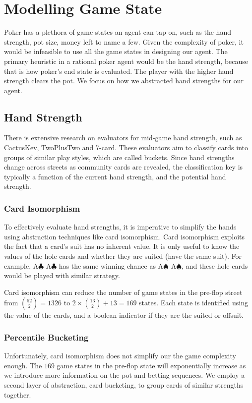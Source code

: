 \documentclass{article}
\begin{document}
\section{Modelling Game State}
Poker has a plethora of game states an agent can tap on, such as the hand strength, pot size, money left to name a few. Given the complexity of poker, it would be infeasible to use all the game states in designing our agent. The primary heuristic in a rational poker agent would be the hand strength, because that is how poker's end state is evaluated. The player with the higher hand strength clears the pot. We focus on how we abstracted hand strengths for our agent.

\subsection{Hand Strength}
There is extensive research on evaluators for mid-game hand strength, such as CactusKev, TwoPlusTwo and 7-card. These evaluators aim to classify cards into groups of similar play styles, which are called buckets. Since hand strengths change across streets as community cards are revealed, the classification key is typically a function of the current hand strength, and the potential hand strength.

\subsubsection{Card Isomorphism}
To effectively evaluate hand strengths, it is imperative to simplify the hands using abstraction techniques like card isomorphism. Card isomorphism exploits the fact that a card's suit has no inherent value. It is only useful to know the values of the hole cards and whether they are suited (have the same suit). For example, A$\clubsuit$ A$\clubsuit$ has the same winning chance as A$\spadesuit$ A$\spadesuit$, and these hole cards would be played with similar strategy.

Card isomorphism can reduce the number of game states in the pre-flop street from ${52 \choose 2} = 1326$ to $2 \times {13 \choose 2} + 13 = 169$ states. Each state is identified using the value of the cards, and a boolean indicator if they are the suited or offsuit.

\subsubsection{Percentile Bucketing}
Unfortunately, card isomorphism does not simplify our the game complexity enough. The $169$ game states in the pre-flop state will exponentially increase as we introduce more information on the pot and betting sequences. We employ a second layer of abstraction, card bucketing, to group cards of similar strengths together. 
\end{document}

